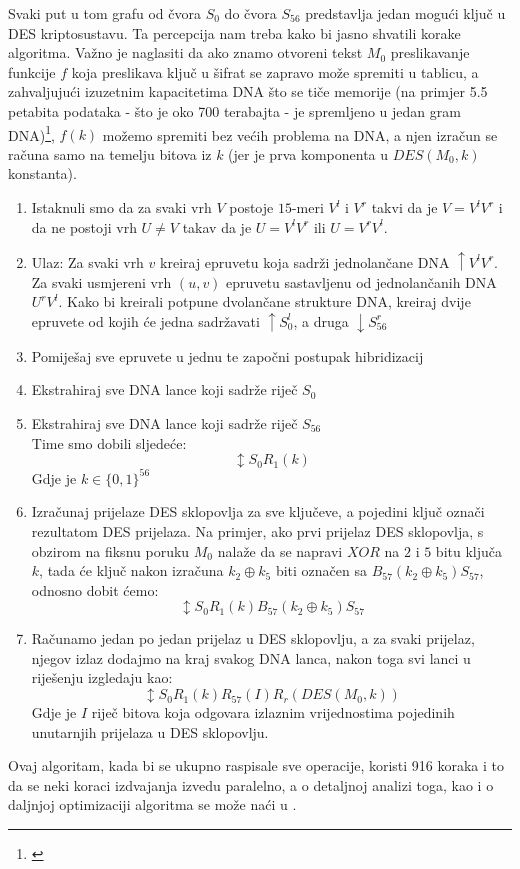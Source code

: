 \documentclass[a4paper,oneside,12pt]{memoir} %
\begin{document}
\begin{spacing}{1.5}
Svaki put u tom grafu od čvora $S_0$ do čvora $S_{56}$ predstavlja jedan mogući ključ u DES kriptosustavu. Ta percepcija nam treba kako bi jasno shvatili korake algoritma. Važno je naglasiti da ako znamo otvoreni tekst $M_0$ preslikavanje funkcije $f$ koja preslikava ključ u šifrat se zapravo može spremiti u tablicu, a zahvaljujući izuzetnim kapacitetima DNA što se tiče memorije (na primjer 5.5 petabita podataka - što je oko 700 terabajta - je spremljeno u jedan gram DNA)\footnote{\cite{Church}}, $f(k)$ možemo spremiti bez većih problema na DNA, a njen izračun se računa samo na temelju bitova iz $k$ (jer je prva komponenta u $DES(M_0,k)$ konstanta).
\begin{enumerate}
\item Istaknuli smo da za svaki vrh $V$ postoje $15$-meri $V^l$ i $V^r$ takvi da je $V=V^lV^r$ i da ne postoji vrh $U \neq V$ takav da je $U=V^lV^r$ ili $U=V^rV^l$.
\item  Ulaz: Za svaki vrh $v$ kreiraj epruvetu koja sadrži jednolančane DNA $\uparrow V^lV^r$. Za svaki usmjereni vrh $(u,v)$ epruvetu sastavljenu  od jednolančanih DNA $U^rV^l$. Kako bi kreirali potpune dvolančane strukture DNA, kreiraj dvije epruvete od kojih će jedna sadržavati $\uparrow S_0 ^l$, a druga $\downarrow S_{56}^r$
\item Pomiješaj sve epruvete u jednu te započni postupak hibridizacij
\item Ekstrahiraj sve DNA lance koji sadrže riječ $S_0$
\item Ekstrahiraj sve DNA lance koji sadrže riječ $S_{56}$\\
Time smo dobili sljedeće:
\[\updownarrow S_0R_1(k)\]
Gdje je $k \in \{0,1\}^{56}$
\item Izračunaj prijelaze DES sklopovlja za sve ključeve, a pojedini ključ označi rezultatom DES prijelaza. Na primjer, ako prvi prijelaz DES sklopovlja, s obzirom na fiksnu poruku $M_0$ nalaže da se napravi $XOR$ na $2$ i $5$ bitu ključa $k$, tada će ključ nakon izračuna $k_2 \oplus k_5$ biti označen sa $B_{57}(k_2 \oplus k_5)S_{57}$, odnosno dobit ćemo:
\[\updownarrow S_0R_1(k)B_{57}(k_2 \oplus k_5)S_{57}\] 
\item Računamo jedan po jedan prijelaz u DES sklopovlju, a za svaki prijelaz, njegov izlaz dodajmo na kraj svakog DNA lanca, nakon toga svi lanci u riješenju izgledaju kao:
\[\updownarrow S_0R_1(k)R_{57}(I)R_r(DES(M_0,k))\]
Gdje je $I$ riječ bitova koja odgovara izlaznim vrijednostima pojedinih unutarnjih prijelaza u DES sklopovlju. 
\end{enumerate} 
Ovaj algoritam, kada bi se ukupno raspisale sve operacije, koristi 916 koraka i to da se neki koraci izdvajanja izvedu paralelno, a o detaljnoj analizi toga, kao i o daljnjoj optimizaciji algoritma se može naći u \cite{DESbreak}.


\end{spacing}
\end{document}
